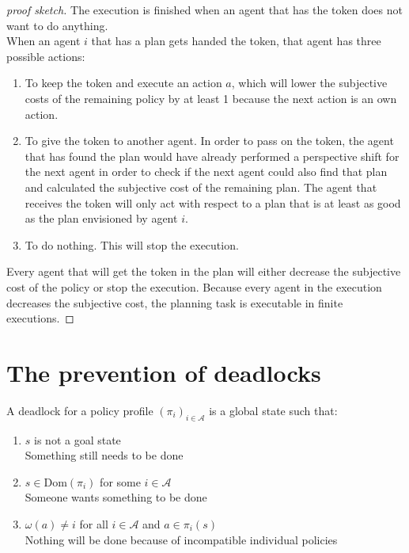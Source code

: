 \begin{proof}[proof sketch]
  The execution is finished when an agent that has the token does not want to do anything. \\
  When an agent $i$ that has a plan gets handed the token, that agent has three possible actions:
  \begin{enumerate}
    \item To keep the token and execute an action $a$, which will lower the subjective costs of the remaining policy by at least 1 because the next action is an own action.

    \item To give the token to another agent. In order to pass on the token, the agent that has found the plan would have already performed a perspective shift for the next agent in order to check if the next agent could also find that plan and calculated the subjective cost of the remaining plan. The agent that receives the token will only act with respect to a plan that is at least as good as the plan envisioned by agent $i$.


    \item To do nothing. This will stop the execution.

  \end{enumerate}
  Every agent that will get the token in the plan will either decrease the subjective cost of the policy or stop the execution. Because every agent in the execution decreases the subjective cost, the planning task is executable in finite executions.
\end{proof}


\section{The prevention of deadlocks}

A deadlock for a policy profile $(\pi_i)_{i \in \mathcal{A}}$ is a global state such that:
\begin{enumerate}
  \item $s$ is not a goal state \\
    Something still needs to be done
  \item $s \in \text{Dom}(\pi_i)$ for some $i \in \mathcal{A}$ \\
    Someone wants something to be done
  \item $\omega(a) \neq i$ for all $i \in \mathcal{A}$ and $a \in \pi_i(s)$ \\
    Nothing will be done because of incompatible individual policies
\end{enumerate}

